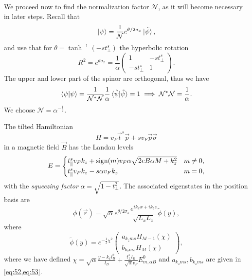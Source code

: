 We proceed now to find the normalization factor \( \mathcal{N} \), as it will become necessary in later steps.
Recall that
\[
  \ket{\psi} = \frac{1}{\mathcal{N}} e^{\theta /2 \sigma _x} \ket{\tilde{\psi}},
\]
and use that for \( \theta = \tanh^{-1}(-s t^s_{\perp}) \) the hyperbolic rotation
\[
  R^2 =
e^{\theta \sigma _x} =
\frac{1}{\alpha }
\begin{pmatrix}
  1 & -s t_{\perp}^s\\
  -s t_{\perp}^s & 1
\end{pmatrix}.
\]
The upper and lower part of the spinor are orthogonal, thus we have
\begin{equation}
  \label{eq:54}
  \braket{\psi  | \psi } = \frac{1}{\mathcal{N}^{*} \mathcal{N}} \frac{1}{\alpha } \braket{\tilde{\psi}  | \tilde{\psi} } = 1 \implies \mathcal{N}^{*}\mathcal{N} = \frac{1}{\alpha }.
\end{equation}
We choose \( \mathcal{N} = \alpha^{-\frac{1}{2}} \).

\begin{summary}\label{summary:llevels}
The tilted Hamiltonian
  \[
    H = v_F \vec{t}^s \vec{p} + s v_F \vec{p} \vec{\sigma}
  \]
  in a magnetic field \( \vec{B} \) has the Landau levels
  \[
    E =
    \begin{cases}
      t^s_{\parallel} v_F k_z + \operatorname{sign}(m) v_F \alpha \sqrt{2 e B \alpha M + k_{z} ^2} & m \neq 0,\\
      t^s_{\parallel} v_F k_z - s \alpha v_F k_z & m = 0,
    \end{cases}
  \]
  with the \emph{squeezing factor} \( \alpha = \sqrt{1 - t_{\perp} ^2}  \).
  The associated eigenstates in the position basis are
  \[
    \phi(\vec{r}) = \sqrt{\alpha} e^{\theta /2 \sigma_x}
    \frac{
      e^{ik_{x} x + ik_{z} z}
    }{
      \sqrt{L_{x}  L_z}
    } \tilde{\phi}(y),
    \]
    where
    \[
      \tilde{\phi} (y) = e^{-\frac{1}{2} \chi^2}
      \begin{pmatrix}
        a_{k_z m s} H_{M - 1} (\chi) \\
        b_{k_z m s} H_M (\chi)
      \end{pmatrix},
    \]
    where we have defined \( \chi = \sqrt{\alpha} \frac{ y - k_x l_B^2 }{l_{B}} + \frac{t_{\perp}^s l_B}{\sqrt{\alpha} v_{F}} E^0_{m, \alpha B} \) and \( a_{k_z m s}, b_{k_z m s} \) are given in \cref{eq:52,eq:53}.
\end{summary}
